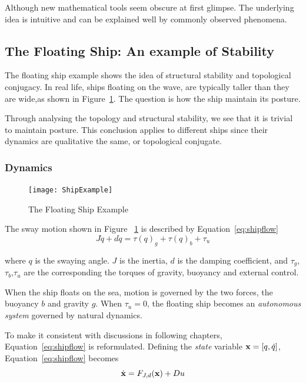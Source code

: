 Although new mathematical tools seem obscure at first glimpse.
The underlying idea is intuitive and can be explained well by commonly observed phenomena.



\subsection{The Floating Ship: An example of Stability}
The floating ship  example shows the idea of structural stability and topological conjugacy.
In real life, ships floating on the wave, are typically taller than they are wide,as shown in Figure~\ref{fig:ShipFloating}.
The  question is how the ship maintain its posture.

Through analysing the topology and structural stability, we see that it is trivial to maintain posture.
This conclusion applies to different ships since their dynamics are qualitative the same, or topological conjugate.


\subsubsection*{Dynamics}

\begin{figure}[!htbp]
  \begin{center}
    \texttt{[image: ShipExample]}
    \caption{The Floating Ship Example}
    \label{fig:ShipFloating}
  \end{center}
\end{figure}

The sway motion shown in Figure ~\ref{fig:ShipFloating} is described by Equation~\ref{eq:shipflow}
\begin{equation}
\label{eq:shipflow}
J\ddot{q}+d\dot{q}=\tau(q)_{g}+\tau(q)_{b}+\tau_{u}
\end{equation}


where $q$ is the swaying angle.
$J$ is the inertia,  
$d$ is the damping coefficient,
and $\tau_{g}$,$\tau_{b}$,$\tau_{u}$ are the corresponding the torques of gravity, buoyancy and external control.

When the ship floats on the sea, motion is governed by the two forces, the buoyancy $b$ and gravity $g$.
When $\tau_{u}=0$,  the floating ship  becomes an \emph{autonomous system} governed by natural dynamics.

To make it consistent with discussions in following chapters, Equation~\ref{eq:shipflow} is reformulated.
Defining the \emph{state} variable $\mathbf{x}=[q,\dot{q}]$, Equation~\ref{eq:shipflow} becomes
\[
\dot{\mathbf{x}}=F_{J,d}(\mathbf{x})+Du
\]

